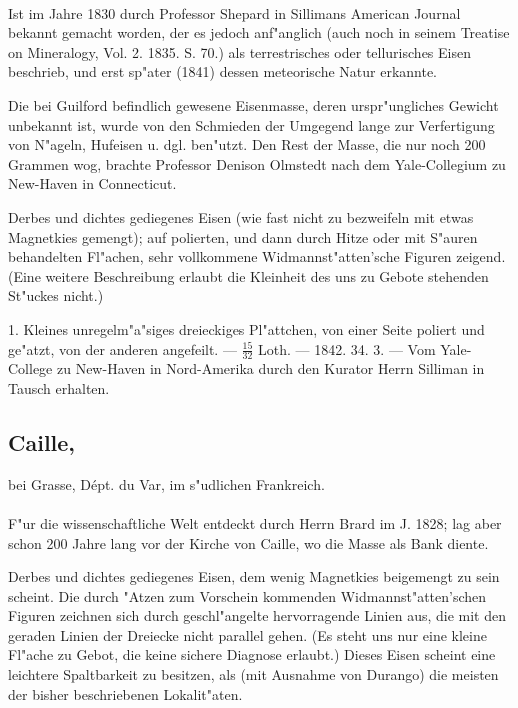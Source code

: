 \documentclass[a4paper, 11pt, oneside, polutonikogreek, german]{article}
\begin{document}
\paragraph{}
Ist im Jahre 1830 durch Professor Shepard in Sillimans American Journal bekannt gemacht worden, der es jedoch anf"anglich (auch noch in seinem Treatise on Mineralogy, Vol. 2. 1835. S. 70.) als terrestrisches oder tellurisches Eisen beschrieb, und erst sp"ater (1841) dessen meteorische Natur erkannte.

\setlength{\leftskip}{10mm}
\setlength{\parindent}{0pt}

{\footnotesize Die bei Guilford befindlich gewesene Eisenmasse, deren urspr"ungliches Gewicht unbekannt ist, wurde von den Schmieden der Umgegend lange zur Verfertigung von N"ageln, Hufeisen u. dgl. ben"utzt. Den Rest der Masse, die nur noch 200 Grammen wog, brachte Professor Denison Olmstedt nach dem Yale-Collegium zu New-Haven in Connecticut.}

\setlength{\leftskip}{0pt}
\setlength{\parindent}{20pt}

Derbes und dichtes gediegenes Eisen (wie fast nicht zu bezweifeln mit etwas Magnetkies gemengt); auf polierten, und dann durch Hitze oder mit S"auren behandelten Fl"achen, sehr vollkommene Widmannst"atten'sche Figuren zeigend. (Eine weitere Beschreibung erlaubt die Kleinheit des uns zu Gebote stehenden St"uckes nicht.)

1. Kleines unregelm"a"siges dreieckiges Pl"attchen, von einer Seite poliert und ge"atzt, von der anderen angefeilt. --- $\frac{15}{32}$ Loth. --- 1842. 34. 3. --- Vom Yale-College zu New-Haven in Nord-Amerika durch den Kurator Herrn Silliman in Tausch erhalten.
\subsection[Caille.]{Caille,}
\begin{center}
\small
bei Grasse, Dépt. du Var, im s"udlichen Frankreich.
\end{center}
\paragraph{}
F"ur die wissenschaftliche Welt entdeckt durch Herrn Brard im J. 1828; lag aber schon 200 Jahre lang vor der Kirche von Caille, wo die Masse als Bank diente.

Derbes und dichtes gediegenes Eisen, dem wenig Magnetkies beigemengt zu sein scheint. Die durch "Atzen zum Vorschein kommenden Widmannst"atten'schen Figuren zeichnen sich durch geschl"angelte hervorragende Linien aus, die mit den geraden Linien der Dreiecke nicht parallel gehen. (Es steht uns nur eine kleine Fl"ache zu Gebot, die keine sichere Diagnose erlaubt.) Dieses Eisen scheint eine leichtere Spaltbarkeit zu besitzen, als (mit Ausnahme von Durango) die meisten der bisher beschriebenen Lokalit"aten.
\end{document}
